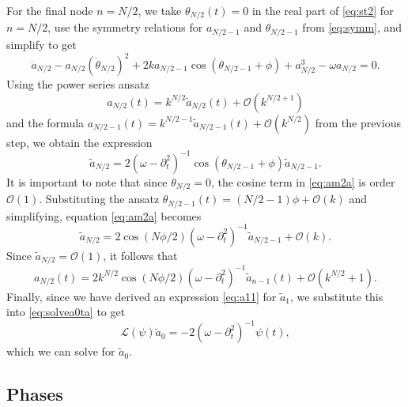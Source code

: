 \documentclass[11pt,reqno]{amsart}
\def\calL{{\mathcal L}}
\begin{document}
For the final node $n=N/2$, we take $\theta_{N/2}(t) = 0$ in the real part of \cref{eq:st2} for $n = N/2$, use the symmetry relations for $a_{N/2-1}$ and $\theta_{N/2-1}$ from \cref{eq:symm}, and simplify to get
\[
\ddot a_{N/2} - a_{N/2} (\dot \theta_{N/2})^2 + 
2 k a_{N/2-1}\cos( \theta_{N/2-1} + \phi) + a_{N/2}^3 - \omega a_{N/2} = 0.
\]
Using the power series ansatz
\[
a_{N/2}(t) = k^{N/2} \tilde{a}_{N/2}(t) + \mathcal{O}(k^{N/2+1})
\]
and the formula $a_{N/2-1}(t) = k^{N/2-1} \tilde{a}_{N/2-1}(t) + \mathcal{O}(k^{N/2})$ from the previous step, we obtain the expression
\begin{equation}\label{eq:am2a}
\tilde{a}_{N/2} = 2 (\omega - \partial_t^2)^{-1}\cos( \theta_{N/2-1} + \phi) \tilde{a}_{N/2-1}.
\end{equation}
It is important to note that since $\theta_{N/2} = 0$, the cosine term in \cref{eq:am2a} is order $\mathcal{O}(1)$. Substituting the ansatz $\theta_{N/2-1}(t) = (N/2-1)\phi + \mathcal{O}(k)$ and simplifying, equation \cref{eq:am2a} becomes
\begin{equation}\label{eq:am2}
\tilde{a}_{N/2} = 2 \cos( N\phi/2)(\omega - \partial_t^2)^{-1} \tilde{a}_{N/2-1} + \mathcal{O}(k).
\end{equation}
Since $\tilde{a}_{N/2} = \mathcal{O}(1)$, it follows that
\begin{equation}\label{eq:am2eq}
a_{N/2}(t) = 2 k^{N/2} \cos\left( N\phi / 2\right) (\omega - \partial_t^2)^{-1} \tilde{a}_{n-1}(t) + \mathcal{O}(k^{N/2}+1).
\end{equation}
Finally, since we have derived an expression \cref{eq:a11} for $\tilde{a}_1$, we substitute this into \cref{eq:solvea0ta} to get 
\[
\calL(\psi) \tilde{a}_0 = -2 (\omega - \partial_t^2)^{-1} \psi(t),
\]
which we can solve for $\tilde{a}_0$.

\subsection{Phases}
\end{document}
